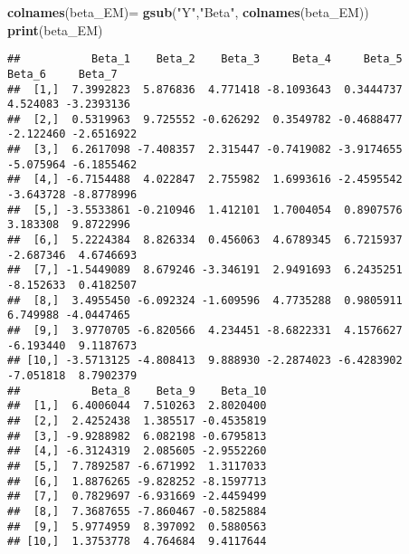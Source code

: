 \documentclass[
]{article}
\newenvironment{Shaded}{\begin{snugshade}}{\end{snugshade}}
\newcommand{\AttributeTok}[1]{\textcolor[rgb]{0.13,0.29,0.53}{#1}}
\newcommand{\FunctionTok}[1]{\textcolor[rgb]{0.13,0.29,0.53}{\textbf{#1}}}
\newcommand{\NormalTok}[1]{#1}
\newcommand{\OtherTok}[1]{\textcolor[rgb]{0.56,0.35,0.01}{#1}}
\newcommand{\SpecialCharTok}[1]{\textcolor[rgb]{0.81,0.36,0.00}{\textbf{#1}}}
\newcommand{\StringTok}[1]{\textcolor[rgb]{0.31,0.60,0.02}{#1}}
\begin{document}
\begin{Shaded}
\begin{Highlighting}[]
\FunctionTok{colnames}\NormalTok{(beta\_EM)}\OtherTok{=} \FunctionTok{gsub}\NormalTok{(}\StringTok{"Y"}\NormalTok{,}\StringTok{"Beta"}\NormalTok{, }\FunctionTok{colnames}\NormalTok{(beta\_EM))}
\FunctionTok{print}\NormalTok{(beta\_EM)}
\end{Highlighting}
\end{Shaded}

\begin{verbatim}
##           Beta_1    Beta_2    Beta_3     Beta_4     Beta_5    Beta_6     Beta_7
##  [1,]  7.3992823  5.876836  4.771418 -8.1093643  0.3444737  4.524083 -3.2393136
##  [2,]  0.5319963  9.725552 -0.626292  0.3549782 -0.4688477 -2.122460 -2.6516922
##  [3,]  6.2617098 -7.408357  2.315447 -0.7419082 -3.9174655 -5.075964 -6.1855462
##  [4,] -6.7154488  4.022847  2.755982  1.6993616 -2.4595542 -3.643728 -8.8778996
##  [5,] -3.5533861 -0.210946  1.412101  1.7004054  0.8907576  3.183308  9.8722996
##  [6,]  5.2224384  8.826334  0.456063  4.6789345  6.7215937 -2.687346  4.6746693
##  [7,] -1.5449089  8.679246 -3.346191  2.9491693  6.2435251 -8.152633  0.4182507
##  [8,]  3.4955450 -6.092324 -1.609596  4.7735288  0.9805911  6.749988 -4.0447465
##  [9,]  3.9770705 -6.820566  4.234451 -8.6822331  4.1576627 -6.193440  9.1187673
## [10,] -3.5713125 -4.808413  9.888930 -2.2874023 -6.4283902 -7.051818  8.7902379
##           Beta_8    Beta_9    Beta_10
##  [1,]  6.4006044  7.510263  2.8020400
##  [2,]  2.4252438  1.385517 -0.4535819
##  [3,] -9.9288982  6.082198 -0.6795813
##  [4,] -6.3124319  2.085605 -2.9552260
##  [5,]  7.7892587 -6.671992  1.3117033
##  [6,]  1.8876265 -9.828252 -8.1597713
##  [7,]  0.7829697 -6.931669 -2.4459499
##  [8,]  7.3687655 -7.860467 -0.5825884
##  [9,]  5.9774959  8.397092  0.5880563
## [10,]  1.3753778  4.764684  9.4117644
\end{verbatim}

\begin{Shaded}
\end{Shaded}
\end{document}
